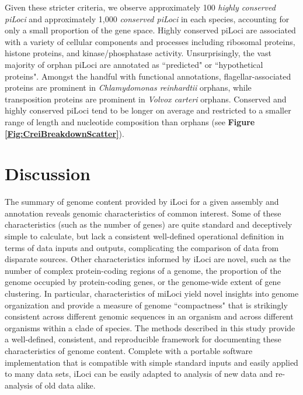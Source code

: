 Given these stricter criteria, we observe approximately 100 \textit{highly conserved piLoci} and approximately 1,000 \textit{conserved piLoci} in each species, accounting for only a small proportion of the gene space.
Highly conserved piLoci are associated with a variety of cellular components and processes including ribosomal proteins, histone proteins, and kinase/phosphatase activity.
Unsurprisingly, the vast majority of orphan piLoci are annotated as ``predicted" or ``hypothetical proteins".
Amongst the handful with functional annotations, flagellar-associated proteins are prominent in \textit{Chlamydomonas reinhardtii} orphans, while transposition proteins are prominent in \textit{Volvox carteri} orphans.
Conserved and highly conserved piLoci tend to be longer on average and restricted to a smaller range of length and nucleotide composition than orphans (see \textbf{Figure \ref{Fig:CreiBreakdownScatter}}).









\section{Discussion}

The summary of genome content provided by iLoci for a given assembly and annotation reveals genomic characteristics of common interest.
Some of these characteristics (such as the number of genes) are quite standard and deceptively simple to calculate, but lack a consistent well-defined operational definition in terms of data inputs and outputs, complicating the comparison of data from disparate sources.
Other characteristics informed by iLoci are novel, such as the number of complex protein-coding regions of a genome, the proportion of the genome occupied by protein-coding genes, or the genome-wide extent of gene clustering.
In particular, characteristics of miLoci yield novel insights into genome organization and provide a measure of genome ``compactness" that is strikingly consistent across different genomic sequences in an organism and across different organisms within a clade of species.
The methods described in this study provide a well-defined, consistent, and reproducible framework for documenting these characteristics of genome content.
Complete with a portable software implementation that is compatible with simple standard inputs and easily applied to many data sets, iLoci can be easily adapted to analysis of new data and re-analysis of old data alike.

